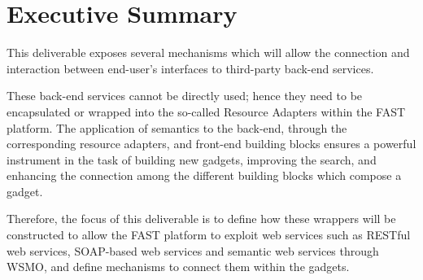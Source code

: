 \documentclass{fast_latex}
\begin{document}
\color{black}

\vfill

\newpage


\clearpage

\section*{Executive Summary}
\doublespacing

This deliverable exposes several mechanisms which will allow the connection and interaction between end-user's interfaces to third-party back-end services.

These back-end services cannot be directly used; hence they need to be encapsulated or wrapped into the so-called Resource Adapters within the FAST platform. The application of semantics to the back-end, through the corresponding resource adapters, and front-end building blocks ensures a powerful instrument in the task of building new gadgets, improving the search, and enhancing the connection among the different building blocks which compose a gadget.

Therefore, the focus of this deliverable is to define how these wrappers will be constructed to allow the FAST platform to exploit web services \cite{GustavoAlonso2003} such as RESTful web services, SOAP-based web services and semantic web services through WSMO, and define mechanisms to connect them within the gadgets.

\newpage

\end{document}

